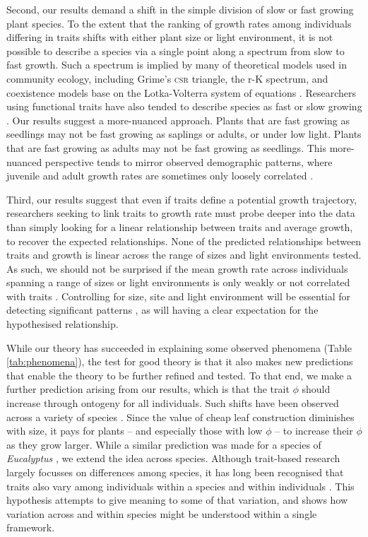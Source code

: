 \documentclass[9pt,twocolumn,twoside,lineno]{pnas-new}
\begin{document}
Second, our results demand a shift in the simple division of slow or fast growing plant species. To the extent that the ranking of growth rates among individuals differing in traits shifts with either plant size or light environment, it is not possible to describe a species via a single point along a spectrum from slow to fast growth. Such a spectrum is implied by many of theoretical models used in community ecology, including Grime's \textsc{csr} triangle, the r-K spectrum, and coexistence models base on the Lotka-Volterra system of equations \citep[e.g.][]{Grime-1977,Chesson-2000}. Researchers using functional traits have also tended to describe species as fast or slow growing \citep[e.g.][]{Adler-2014, Diaz-2016}. Our results suggest a more-nuanced approach. Plants that are fast growing as seedlings may not be fast growing as saplings or adults, or under low light. Plants that are fast growing as adults may not be fast growing as seedlings. This more-nuanced perspective tends to mirror observed demographic patterns, where juvenile and adult growth rates are sometimes only loosely correlated \citep{Rees-2001}.

Third, our results suggest that even if traits define a potential growth trajectory, researchers seeking to link traits to growth rate must probe deeper into the data than simply looking for a linear relationship between traits and average growth, to recover the expected relationships. None of the predicted relationships between traits and growth is linear across the range of sizes and light environments tested. As such, we should not be surprised if the mean growth rate across individuals spanning a range of sizes or light environments is only weakly or not correlated with traits \citep[e.g.][]{Poorter-2008,Paine-2015}. Controlling for size, site and light environment will be essential for detecting significant patterns \citep[e.g.][]{Gibert-2016}, as will having a clear expectation for the hypothesised relationship.

While our theory has succeeded in explaining some observed phenomena (Table \ref{tab:phenomena}), the test for good theory is that it also makes new predictions that enable the theory to be further refined and tested. To that end, we make a further prediction arising from our results, which is that the trait $\phi$ should increase through ontogeny for all individuals. Such shifts have been observed across a variety of species \citep{King-1999,Thomas-1999,Koch-2004}. Since the value of cheap leaf construction diminishes with size, it pays for plants -- and especially those with low $\phi$ -- to increase their $\phi$ as they grow larger. While a similar prediction was made for a species of \emph{Eucalyptus} \citep{King-1999}, we extend the idea across species. Although trait-based research largely focusses on differences among species, it has long been recognised that traits also vary among individuals within a species and within individuals \citep{Westoby-2002}. This hypothesis attempts to give meaning to some of that variation, and shows how variation across and within species might be understood within a single framework.
\end{document}
